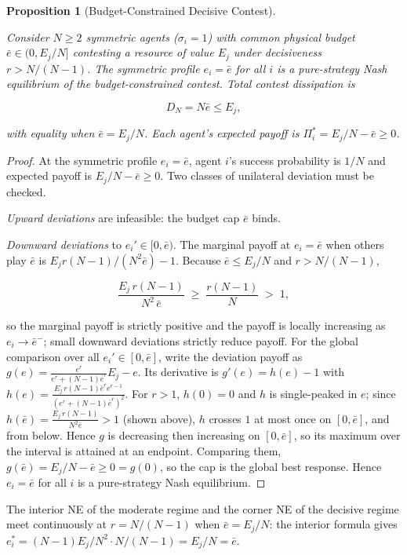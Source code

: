\documentclass[11pt]{article}
\theoremstyle{plain}
\newtheorem{proposition}[theorem]{Proposition}
\theoremstyle{definition}
\theoremstyle{remark}
\begin{document}
\begin{proposition}[Budget-Constrained Decisive Contest]
\label{prop-budget-constrained-decisive}

Consider $N \geq 2$ symmetric agents ($\sigma_i = 1$) with common physical budget $\bar e \in (0, E_j/N]$ contesting a resource of value $E_j$ under decisiveness $r > N/(N-1)$. The symmetric profile $e_i = \bar e$ for all $i$ is a pure-strategy Nash equilibrium of the budget-constrained contest. Total contest dissipation is

$$D_N = N \bar e \leq E_j,$$

with equality when $\bar e = E_j/N$. Each agent's expected payoff is $\Pi_i^* = E_j/N - \bar e \geq 0$.
\end{proposition}

\begin{proof}
At the symmetric profile $e_i = \bar e$, agent $i$'s success probability is $1/N$ and expected payoff is $E_j/N - \bar e \geq 0$. Two classes of unilateral deviation must be checked.

\emph{Upward deviations} are infeasible: the budget cap $\bar e$ binds.

\emph{Downward deviations} to $e_i' \in [0, \bar e)$. The marginal payoff at $e_i = \bar e$ when others play $\bar e$ is $E_j r(N-1)/(N^2 \bar e) - 1$. Because $\bar e \leq E_j/N$ and $r > N/(N-1)$,

$$\frac{E_j \, r(N-1)}{N^2 \, \bar e} \;\geq\; \frac{r(N-1)}{N} \;>\; 1,$$

so the marginal payoff is strictly positive and the payoff is locally increasing as $e_i \to \bar e^-$; small downward deviations strictly reduce payoff. For the global comparison over all $e_i' \in [0, \bar e]$, write the deviation payoff as $g(e) = \frac{e^r}{e^r + (N-1)\bar e^r} E_j - e$. Its derivative is $g'(e) = h(e) - 1$ with $h(e) = \frac{E_j \, r (N-1) \bar e^r e^{r-1}}{(e^r + (N-1)\bar e^r)^2}$. For $r > 1$, $h(0) = 0$ and $h$ is single-peaked in $e$; since $h(\bar e) = \frac{E_j \, r(N-1)}{N^2 \bar e} > 1$ (shown above), $h$ crosses $1$ at most once on $[0, \bar e]$, and from below. Hence $g$ is decreasing then increasing on $[0, \bar e]$, so its maximum over the interval is attained at an endpoint. Comparing them, $g(\bar e) = E_j/N - \bar e \geq 0 = g(0)$, so the cap is the global best response. Hence $e_i = \bar e$ for all $i$ is a pure-strategy Nash equilibrium.
\end{proof}

The interior NE of the moderate regime and the corner NE of the decisive
regime meet continuously at \(r = N/(N-1)\) when \(\bar e = E_j/N\): the
interior formula gives
\(e_i^* = (N-1) E_j/N^2 \cdot N/(N-1) = E_j/N = \bar e\).
\end{document}
